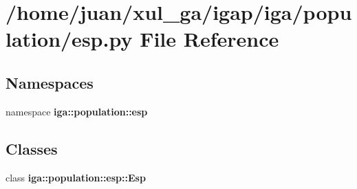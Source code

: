 \section{/home/juan/xul\_\-ga/igap/iga/population/esp.py File Reference}
\label{esp_8py}
\subsection*{Namespaces}
\begin{CompactItemize}
\item 
namespace {\bf iga::population::esp}
\end{CompactItemize}
\subsection*{Classes}
\begin{CompactItemize}
\item 
class {\bf iga::population::esp::Esp}
\end{CompactItemize}

